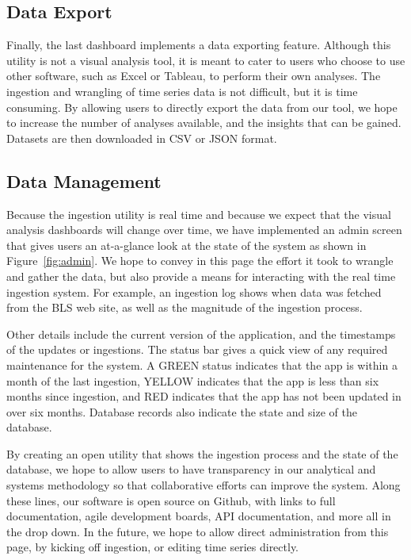 \documentclass{sigchi}
\begin{document}
\subsection{Data Export}

Finally, the last dashboard implements a data exporting feature. Although this utility is not a visual analysis tool, it is meant to cater to users who choose to use other software, such as Excel or Tableau, to perform their own analyses. The ingestion and wrangling of time series data is not difficult, but it is time consuming. By allowing users to directly export the data from our tool, we hope to increase the number of analyses available, and the insights that can be gained. Datasets are then downloaded in CSV or JSON format.

\subsection{Data Management}

Because the ingestion utility is real time and because we expect that the visual analysis dashboards will change over time, we have implemented an admin screen that gives users an at-a-glance look at the state of the system as shown in Figure~\ref{fig:admin}. We hope to convey in this page the effort it took to wrangle and gather the data, but also provide a means for interacting with the real time ingestion system. For example, an ingestion log shows when data was fetched from the BLS web site, as well as the magnitude of the ingestion process.

Other details include the current version of the application, and the timestamps of the updates or ingestions. The status bar gives a quick view of any required maintenance for the system. A GREEN status indicates that the app is within a month of the last ingestion, YELLOW indicates that the app is less than six months since ingestion, and RED indicates that the app has not been updated in over six months. Database records also indicate the state and size of the database.

By creating an open utility that shows the ingestion process and the state of the database, we hope to allow users to have transparency in our analytical and systems methodology so that collaborative efforts can improve the system. Along these lines, our software is open source on Github, with links to full documentation, agile development boards, API documentation, and more all in the drop down. In the future, we hope to allow direct administration from this page, by kicking off ingestion, or editing time series directly.
\end{document}
